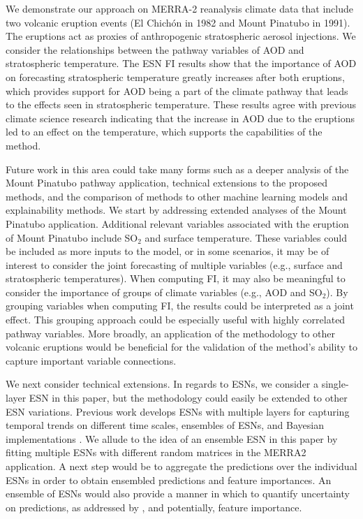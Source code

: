 \documentclass[AMS,STIX2COL]{WileyNJD-v2}
\begin{document}
We demonstrate our approach on MERRA-2 reanalysis climate data that include two volcanic eruption events (El Chich\'{o}n in 1982 and Mount Pinatubo in 1991). The eruptions act as proxies of anthropogenic stratospheric aerosol injections. We consider the relationships between the pathway variables of AOD and stratospheric temperature. The ESN FI results show that the importance of AOD on forecasting stratospheric temperature greatly increases after both eruptions, which provides support for AOD being a part of the climate pathway that leads to the effects seen in stratospheric temperature. These results agree with previous climate science research indicating that the increase in AOD due to the eruptions led to an effect on the temperature, which supports the capabilities of the method.

Future work in this area could take many forms such as a deeper analysis of the Mount Pinatubo pathway application, technical extensions to the proposed methods, and the comparison of methods to other machine learning models and explainability methods. We start by addressing extended analyses of the Mount Pinatubo application. Additional relevant variables associated with the eruption of Mount Pinatubo include SO$_2$ and surface temperature. These variables could be included as more inputs to the model, or in some scenarios, it may be of interest to consider the joint forecasting of multiple variables (e.g., surface and stratospheric temperatures). When computing FI, it may also be meaningful to consider the importance of groups of climate variables (e.g., AOD and SO$_2$). By grouping variables when computing FI, the results could be interpreted as a joint effect. This grouping approach could be especially useful with highly correlated pathway variables. More broadly, an application of the methodology to other volcanic eruptions would be beneficial for the validation of the method's ability to capture important variable connections.

We next consider technical extensions. In regards to ESNs, we consider a single-layer ESN in this paper, but the methodology could easily be extended to other ESN variations. Previous work develops ESNs with multiple layers for capturing temporal trends on different time scales, ensembles of ESNs, and Bayesian implementations \citep{mcdermott2019}. We allude to the idea of an ensemble ESN in this paper by fitting multiple ESNs with different random matrices in the MERRA2 application. A next step would be to aggregate the predictions over the individual ESNs in order to obtain ensembled predictions and feature importances. An ensemble of ESNs would also provide a manner in which to quantify uncertainty on predictions, as addressed by \citep{mcdermott2019}, and potentially, feature importance.
\end{document}
